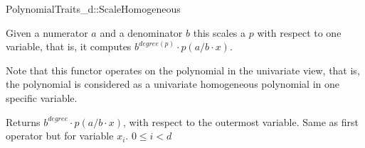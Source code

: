 \begin{ccRefConcept}{PolynomialTraits_d::ScaleHomogeneous}
\ccDefinition

Given a numerator $a$ and a denominator $b$ this  
scales a  $p$ with respect to one variable, 
that is, it computes $b^{degree(p)}\cdot p(a/b\cdot x)$.

Note that this functor operates on the polynomial in the univariate view, that is, 
the polynomial is considered as a univariate homogeneous polynomial in one specific variable. 

\ccRefines 
{}

\ccTypes


\ccOperations
{}
         { Returns $b^{degree}\cdot p(a/b\cdot x)$, 
        with respect to the outermost variable. }
         { Same as first operator but for variable $x_i$. 
          \ccPrecond $0 \leq i  < d$
         }


\ccSeeAlso

\\
\\

\end{ccRefConcept}